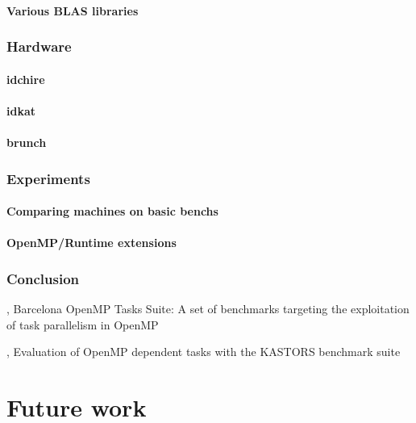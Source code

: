 \subsection{Various BLAS libraries}

\section{Hardware}

\subsection{idchire}
\subsection{idkat}
\subsection{brunch}

\section{Experiments}

\subsection{Comparing machines on basic benchs}
\subsection{OpenMP/Runtime extensions}

\section{Conclusion}

%

\cite{Duran2009}, Barcelona OpenMP Tasks Suite: A set of benchmarks targeting the exploitation of task parallelism in OpenMP

\cite{Virouleau2014}, Evaluation of OpenMP dependent tasks with the KASTORS benchmark suite

\part{Future work}

